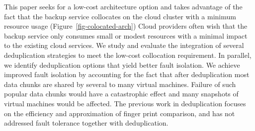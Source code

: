 This paper seeks for a low-cost architecture option and takes advantage of the
fact that the
backup service collocates on the cloud cluster with a minimum resource usage
(Figure~\ref{fig-colocated-arch})
Cloud providers often wish that the backup service only consumes  small or modest resources
with a minimal impact to the existing cloud services.  
We study and evaluate the integration of several deduplication strategies to meet
the low-cost collocation requirement. In parallel, we identify deduplication options that yield
better fault isolation.
We achieve improved fault isolation by accounting for the fact that after
deduplication most data chunks are shared by several to many virtual machines.
Failure of such popular data chunks would have a catastrophic effect and many
snapshots of virtual machines would be affected.
The previous work in deduplication focuses on the efficiency and approximation of
finger print comparison, and has not addressed fault tolerance together with deduplication.


